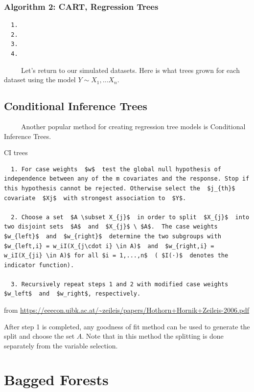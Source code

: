 \documentclass[12pt,twoside]{reedthesis}
\begin{document}
  \subsubsection{Algorithm 2: CART, Regression
  Trees}\label{algorithm-2-cart-regression-trees}
  
  \begin{verbatim}
  1.
  2.
  3.
  4.
  \end{verbatim}
  
  ~~~~~Let's return to our simulated datasets. Here is what trees grown
  for each dataset using the model \(Y\sim X_1,...X_n\).
  
  \subsection{Conditional Inference
  Trees}\label{conditional-inference-trees}
  
  ~~~~~Another popular method for creating regression tree models is
  Conditional Inference Trees.
  
  CI trees
  
  \begin{verbatim}
  1. For case weights  $w$  test the global null hypothesis of independence between any of the m covariates and the response. Stop if this hypothesis cannot be rejected. Otherwise select the  $j_{th}$  covariate  $Xj$  with strongest association to  $Y$.
  
  2. Choose a set  $A \subset X_{j}$  in order to split  $X_{j}$  into two disjoint sets  $A$  and  $X_{j}$ \ $A$.  The case weights  $w_{left}$  and  $w_{right}$  determine the two subgroups with  $w_{left,i} = w_iI(X_{j\cdot i} \in A)$  and  $w_{right,i} = w_iI(X_{ji} \in A)$ for all $i = 1,...,n$  ( $I(·)$  denotes the indicator function). 
  
  3. Recursively repeat steps 1 and 2 with modified case weights  $w_left$  and  $w_right$, respectively. 
  \end{verbatim}
  
  from
  \url{https://eeecon.uibk.ac.at/~zeileis/papers/Hothorn+Hornik+Zeileis-2006.pdf}
  
  After step 1 is completed, any goodness of fit method can be used to
  generate the split and choose the set \(A\). Note that in this method
  the splitting is done separately from the variable selection.
  
  \section{Bagged Forests}\label{bagged-forests}
  
\end{document}
